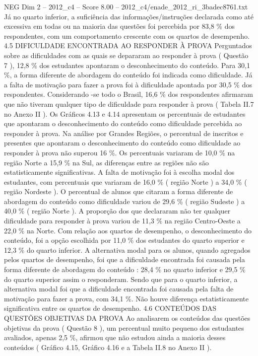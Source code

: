 \begin{textsample}{NEG Dim 2 – 2012\_c4 – Score 8.00 – 2012\_c4/enade\_2012\_ri\_3badec8761.txt}
Já no quarto inferior, a suficiência das informações/instruções declarada como até excessiva em todas ou na maioria das questões foi percebida por 83,8 \% dos respondentes, com um comportamento crescente com os quartos de desempenho. 4.5 DIFICULDADE ENCONTRADA AO RESPONDER À PROVA Perguntados sobre as dificuldades com as quais se depararam ao responder à prova ( Questão 7 ), 12,8 \% dos estudantes apontaram o desconhecimento do conteúdo.
Para 30,1 \%, a forma diferente de abordagem do conteúdo foi indicada como dificuldade.
Já a falta de motivação para fazer a prova foi à dificuldade apontada por 30,5 \% dos respondentes.
Considerando -se todo o Brasil, 16,6 \% dos respondentes afirmaram que não tiveram qualquer tipo de dificuldade para responder à prova ( Tabela II.7 no Anexo II ).
Os Gráficos 4.13 e 4.14 apresentam os percentuais de estudantes que apontaram o desconhecimento do conteúdo como dificuldade percebida ao responder à prova.
Na análise por Grandes Regiões, o percentual de inscritos e presentes que apontaram o desconhecimento do conteúdo como dificuldade ao responder à prova não superou 16 \%.
Os percentuais variaram de 10,0 \% na região Norte a 15,9 \% na Sul, as diferenças entre as regiões não são estatisticamente significativas.
A falta de motivação foi à escolha modal dos estudantes, com percentuais que variaram de 16,0 \% ( região Norte ) a 34,0 \% ( região Nordeste ).
O percentual de alunos que citaram a forma diferente de abordagem do conteúdo como dificuldade variou de 29,6 \% ( região Sudeste ) a 40,0 \% ( região Norte ).
A proporção dos que declararam não ter qualquer dificuldade para responder à prova variou de 11,3 \% na região Centro-Oeste a 22,0 \% na Norte.
Com relação aos quartos de desempenho, o desconhecimento do conteúdo, foi a opção escolhida por 11,0 \% dos estudantes do quarto superior e 12,3 \% do quarto inferior.
A alternativa modal para os alunos, quando agregados pelos quartos de desempenho, foi que a dificuldade encontrada foi causada pela forma diferente de abordagem do conteúdo : 28,4 \% no quarto inferior e 29,5 \% do quarto superior assim o responderam.
Sendo que para o quarto inferior, a alternativa modal foi que a dificuldade encontrada foi causada pela falta de motivação para fazer a prova, com 34,1 \%.
Não houve diferença estatisticamente significativa entre os quartos de desempenho. 4.6 CONTEÚDOS DAS QUESTÕES OBJETIVAS DA PROVA Ao analisarem os conteúdos das questões objetivas da prova ( Questão 8 ), um percentual muito pequeno dos estudantes avaliados, apenas 2,5 \%, afirmou que não estudou ainda a maioria desses conteúdos ( Gráfico 4.15, Gráfico 4.16 e a Tabela II.8 no Anexo II ).

\end{textsample}
